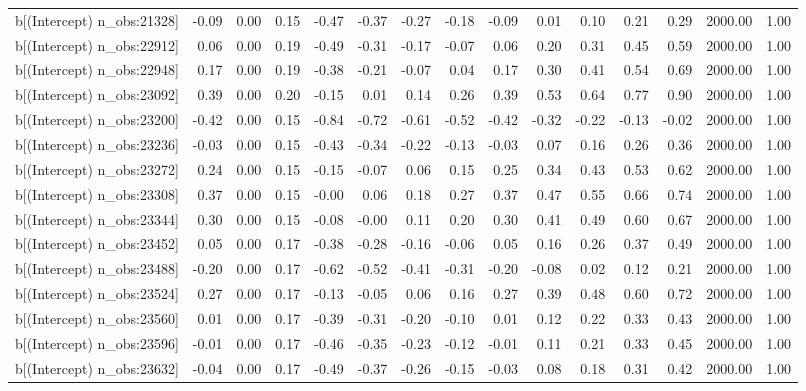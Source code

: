 \begin{table}[ht]
\begin{tabular}{rrrrrrrrrrrrrrr}
  b[(Intercept) n\_obs:21328] & -0.09 & 0.00 & 0.15 & -0.47 & -0.37 & -0.27 & -0.18 & -0.09 & 0.01 & 0.10 & 0.21 & 0.29 & 2000.00 & 1.00 \\ 
  b[(Intercept) n\_obs:22912] & 0.06 & 0.00 & 0.19 & -0.49 & -0.31 & -0.17 & -0.07 & 0.06 & 0.20 & 0.31 & 0.45 & 0.59 & 2000.00 & 1.00 \\ 
  b[(Intercept) n\_obs:22948] & 0.17 & 0.00 & 0.19 & -0.38 & -0.21 & -0.07 & 0.04 & 0.17 & 0.30 & 0.41 & 0.54 & 0.69 & 2000.00 & 1.00 \\ 
  b[(Intercept) n\_obs:23092] & 0.39 & 0.00 & 0.20 & -0.15 & 0.01 & 0.14 & 0.26 & 0.39 & 0.53 & 0.64 & 0.77 & 0.90 & 2000.00 & 1.00 \\ 
  b[(Intercept) n\_obs:23200] & -0.42 & 0.00 & 0.15 & -0.84 & -0.72 & -0.61 & -0.52 & -0.42 & -0.32 & -0.22 & -0.13 & -0.02 & 2000.00 & 1.00 \\ 
  b[(Intercept) n\_obs:23236] & -0.03 & 0.00 & 0.15 & -0.43 & -0.34 & -0.22 & -0.13 & -0.03 & 0.07 & 0.16 & 0.26 & 0.36 & 2000.00 & 1.00 \\ 
  b[(Intercept) n\_obs:23272] & 0.24 & 0.00 & 0.15 & -0.15 & -0.07 & 0.06 & 0.15 & 0.25 & 0.34 & 0.43 & 0.53 & 0.62 & 2000.00 & 1.00 \\ 
  b[(Intercept) n\_obs:23308] & 0.37 & 0.00 & 0.15 & -0.00 & 0.06 & 0.18 & 0.27 & 0.37 & 0.47 & 0.55 & 0.66 & 0.74 & 2000.00 & 1.00 \\ 
  b[(Intercept) n\_obs:23344] & 0.30 & 0.00 & 0.15 & -0.08 & -0.00 & 0.11 & 0.20 & 0.30 & 0.41 & 0.49 & 0.60 & 0.67 & 2000.00 & 1.00 \\ 
  b[(Intercept) n\_obs:23452] & 0.05 & 0.00 & 0.17 & -0.38 & -0.28 & -0.16 & -0.06 & 0.05 & 0.16 & 0.26 & 0.37 & 0.49 & 2000.00 & 1.00 \\ 
  b[(Intercept) n\_obs:23488] & -0.20 & 0.00 & 0.17 & -0.62 & -0.52 & -0.41 & -0.31 & -0.20 & -0.08 & 0.02 & 0.12 & 0.21 & 2000.00 & 1.00 \\ 
  b[(Intercept) n\_obs:23524] & 0.27 & 0.00 & 0.17 & -0.13 & -0.05 & 0.06 & 0.16 & 0.27 & 0.39 & 0.48 & 0.60 & 0.72 & 2000.00 & 1.00 \\ 
  b[(Intercept) n\_obs:23560] & 0.01 & 0.00 & 0.17 & -0.39 & -0.31 & -0.20 & -0.10 & 0.01 & 0.12 & 0.22 & 0.33 & 0.43 & 2000.00 & 1.00 \\ 
  b[(Intercept) n\_obs:23596] & -0.01 & 0.00 & 0.17 & -0.46 & -0.35 & -0.23 & -0.12 & -0.01 & 0.11 & 0.21 & 0.33 & 0.45 & 2000.00 & 1.00 \\ 
  b[(Intercept) n\_obs:23632] & -0.04 & 0.00 & 0.17 & -0.49 & -0.37 & -0.26 & -0.15 & -0.03 & 0.08 & 0.18 & 0.31 & 0.42 & 2000.00 & 1.00 \\ 

\end{tabular}
\end{table}

